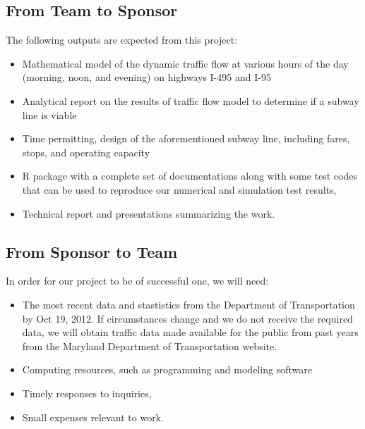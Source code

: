 \documentclass[12pt,letterpaper]{article}
\theoremstyle{definition}
\begin{document}
\subsection{From Team to Sponsor} %
The following outputs are expected from this project:
\begin{itemize}
    \item Mathematical model of the dynamic traffic flow at various hours of the day (morning, noon, and evening) on highways I-495 and I-95
    \item Analytical report on the results of traffic flow model to determine if a subway line is viable
    \item Time permitting, design of the aforementioned subway line, including fares, stops, and operating capacity
    \item R package with a complete set of documentations along with some test 
        codes that can be used to reproduce our numerical and simulation test
        results,
    \item Technical report and presentations summarizing the work. 
\end{itemize}

\subsection{From Sponsor to Team} %

In order for our project to be of successful one, we will need:
\begin{itemize}
    \item The most recent data and stastistics from the Department of Transportation by Oct 19, 2012. If circumstances change and we do not receive the required data, we will obtain traffic data made available for the public from past years from the Maryland Department of Transportation website.
    \item Computing resources, such as programming and modeling software
    \item Timely responses to inquiries, 
    \item Small expenses relevant to work.
\end{itemize}

\newpage

{}
\end{document}
